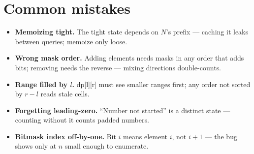 \section{Common mistakes}
\begin{itemize}
\item \textbf{Memoizing tight.} The tight state depends on $N$'s
prefix --- caching it leaks between queries; memoize only loose.
\item \textbf{Wrong mask order.} Adding elements needs masks in any
order that adds bits; removing needs the reverse --- mixing
directions double-counts.
\item \textbf{Range filled by $l$.} dp[l][r] must see smaller
ranges first; any order not sorted by $r-l$ reads stale cells.
\item \textbf{Forgetting leading-zero.} ``Number not started'' is a
distinct state --- counting without it counts padded numbers.
\item \textbf{Bitmask index off-by-one.} Bit $i$ means element $i$,
not $i{+}1$ --- the bug shows only at $n$ small enough to enumerate.
\end{itemize}

